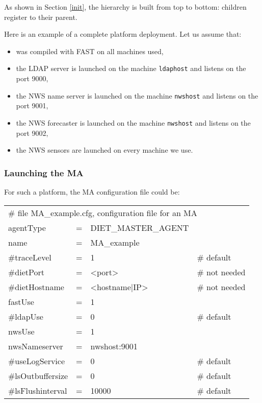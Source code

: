 As shown in Section \ref{init}, the hierarchy is built from top to
bottom: children register to their parent.

Here is an example of a complete platform deployment. Let us assume
that:

\begin{itemize}
\item \diet was compiled with FAST on all machines used,
\item the LDAP server is launched on the machine \texttt{ldaphost} and listens
  on the port 9000,
\item the NWS name server is launched on the machine \texttt{nwshost} and
  listens on the port 9001,
\item the NWS forecaster is launched on the machine \texttt{nwshost} and
  listens on the port 9002,
\item the NWS sensors are launched on every machine we use.
\end{itemize}


\subsubsection{Launching the MA}

For such a platform, the MA configuration file could be:
\tt
\begin{center}
 \footnotesize
 \begin{tabular}{lcll}
  \multicolumn{4}{l}{\# file MA\_example.cfg, configuration file for an MA}\\
  agentType     &=&DIET\_MASTER\_AGENT&\\
  name          &=&MA\_example        &\\
  \#traceLevel  &=&1                  &\# default\\
  \#dietPort    &=&<port>             &\# not needed\\
  \#dietHostname&=&<hostname|IP>      &\# not needed\\
  fastUse       &=&1                  &\\
  \#ldapUse     &=&0                  &\# default\\
  nwsUse        &=&1                  &\\
  nwsNameserver &=&nwshost:9001       &\\
  \#useLogService &=& 0               &\# default\\
  \#lsOutbuffersize &=& 0             &\# default\\
  \#lsFlushinterval &=& 10000           &\# default\\
 \end{tabular}
\end{center}
\rm

